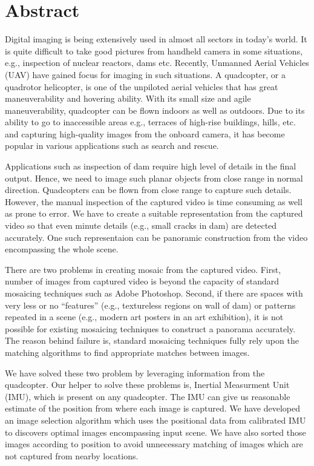 \chapter*{Abstract}
Digital imaging is being extensively used in almost all sectors in today's
world. It is quite difficult to take good pictures from handheld camera in some
situations, e.g., inspection of nuclear reactors, dams etc. Recently, Unmanned
Aerial Vehicles (UAV) have gained focus for imaging in such situations. A
quadcopter, or a quadrotor helicopter, is one of the unpiloted aerial vehicles
that has great maneuverability and hovering ability. With its small size and
agile maneuverability, quadcopter can be flown indoors as well as
outdoors. Due to its ability to go to inaccessible areas e.g., terraces of
high-rise buildings, hills, etc. and capturing high-quality images from the
onboard camera, it has become popular in various applications such as search and
rescue.

Applications such as inspection of dam require high level of details in the
final output. Hence, we need to image such planar objects from close range in
normal direction. Quadcopters can be flown from close range to capture such
details. However, the manual inspection of the captured video is time consuming
as well as prone to error. We have to create a suitable representation from the
captured video so that even minute details (e.g., small cracks in dam) are
detected accurately. One such representaion can be panoramic construction from
the video encompassing the whole scene. 

There are two problems in creating mosaic from the captured video. First, number
of images from captured video is beyond the capacity of standard mosaicing
techniques such as Adobe Photoshop. Second, if there are spaces with very less
or no ``features'' (e.g., textureless regions on wall of dam) or patterns repeated in a scene
(e.g., modern art posters in an art exhibition), it is not possible for existing
mosaicing techniques to construct a panorama accurately. The reason behind 
failure is, standard mosaicing techniques fully rely upon the matching
algorithms to find appropriate matches between images. 

We have solved these two problem by leveraging information from the quadcopter.
Our helper to solve these problems is, Inertial Measurment Unit (IMU),
which is present on any quadcopter. The IMU can give us reasonable estimate of the
position from where each image is captured. We have developed an image selection
algorithm which uses the positional data from calibrated IMU to discovers optimal
images encompassing input scene. We have also sorted those images according to
position to avoid unnecessary matching of images which are not captured from
nearby locations. 

